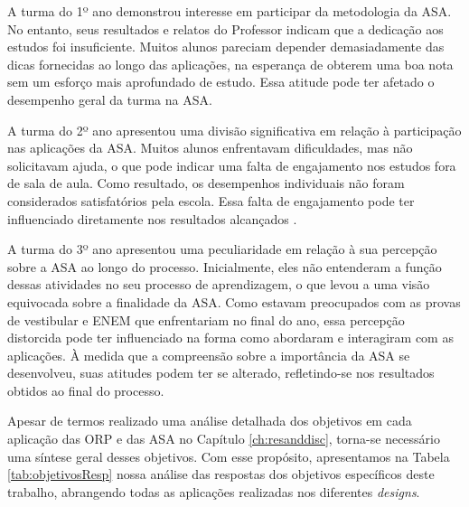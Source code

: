 A turma do 1º ano demonstrou interesse em participar da metodologia da ASA. No entanto, seus resultados e relatos do Professor indicam que a dedicação aos estudos foi insuficiente. Muitos alunos pareciam depender demasiadamente das dicas fornecidas ao longo das aplicações, na esperança de obterem uma boa nota sem um esforço mais aprofundado de estudo. Essa atitude pode ter afetado o desempenho geral da turma na ASA.

A turma do 2º ano apresentou uma divisão significativa em relação à participação nas aplicações da ASA. Muitos alunos enfrentavam dificuldades, mas não solicitavam ajuda, o que pode indicar uma falta de engajamento nos estudos fora de sala de aula. Como resultado, os desempenhos individuais não foram considerados satisfatórios pela escola. Essa falta de engajamento pode ter influenciado diretamente nos resultados alcançados .

A turma do 3º ano apresentou uma peculiaridade em relação à sua percepção sobre a ASA ao longo do processo. Inicialmente, eles não entenderam a função dessas atividades no seu processo de aprendizagem, o que levou a uma visão equivocada sobre a finalidade da ASA. Como estavam preocupados com as provas de vestibular e ENEM que enfrentariam no final do ano, essa percepção distorcida pode ter influenciado na forma como abordaram e interagiram com as aplicações. À medida que a compreensão sobre a importância da ASA se desenvolveu, suas atitudes podem ter se alterado, refletindo-se nos resultados obtidos ao final do processo.

Apesar de termos realizado uma análise detalhada dos objetivos em cada aplicação das ORP e das ASA no Capítulo \ref{ch:resanddisc}, torna-se necessário uma síntese geral desses objetivos. Com esse propósito, apresentamos na Tabela \ref{tab:objetivosResp} nossa análise das respostas dos objetivos específicos deste trabalho, abrangendo todas as aplicações realizadas nos diferentes \textit{designs}.

